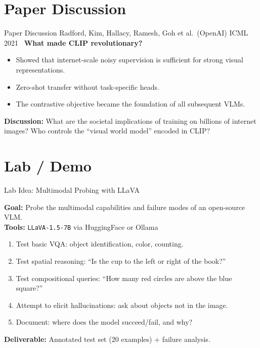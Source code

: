 \documentclass[aspectratio=169,10pt]{beamer}
\begin{document}
\section{Paper Discussion}
\begin{frame}{Paper Discussion}
    {Radford, Kim, Hallacy, Ramesh, Goh et al.\ (OpenAI)}
    {ICML 2021~\cite{radford2021learning}}
  \vspace{0.4em}
  \textbf{What made CLIP revolutionary?}
  \begin{itemize}
    \item Showed that internet-scale noisy supervision is sufficient for strong visual representations.
    \item Zero-shot transfer without task-specific heads.
    \item The contrastive objective became the foundation of all subsequent VLMs.
  \end{itemize}
  \vspace{0.3em}
  \textbf{Discussion:} What are the societal implications of training on billions of internet images?
  Who controls the ``visual world model'' encoded in CLIP?
\end{frame}

\section{Lab / Demo}
\begin{frame}{Lab Idea: Multimodal Probing with LLaVA}
  \begin{tcolorbox}[hitbox, title=Lab 4 — Multimodal VQA]
    \textbf{Goal:} Probe the multimodal capabilities and failure modes of an open-source VLM.\\[4pt]
    \textbf{Tools:} \texttt{LLaVA-1.5-7B} via HuggingFace or Ollama
    \begin{enumerate}
      \item Test basic VQA: object identification, color, counting.
      \item Test spatial reasoning: ``Is the cup to the left or right of the book?''
      \item Test compositional queries: ``How many red circles are above the blue square?''
      \item Attempt to elicit hallucinations: ask about objects not in the image.
      \item Document: where does the model succeed/fail, and why?
    \end{enumerate}
    \textbf{Deliverable:} Annotated test set (20 examples) + failure analysis.
  \end{tcolorbox}
\end{frame}
\end{document}
